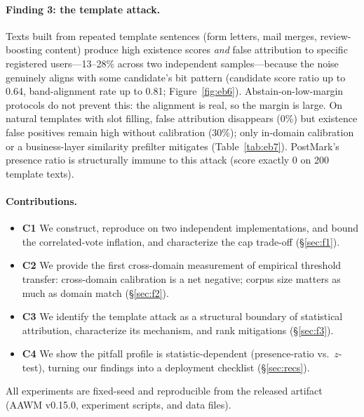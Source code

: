\paragraph{Finding 3: the template attack.}
Texts built from repeated template sentences (form letters, mail merges,
review-boosting content) produce high existence scores \emph{and} false
attribution to specific registered users---13--28\% across two independent
samples---because the noise genuinely aligns with some candidate's bit
pattern (candidate score ratio up to 0.64, band-alignment rate up to 0.81;
Figure~\ref{fig:eb6}). Abstain-on-low-margin protocols do not prevent this:
the alignment is real, so the margin is large. On natural templates with
slot filling, false attribution disappears (0\%) but existence false
positives remain high without calibration (30\%); only in-domain calibration
or a business-layer similarity prefilter mitigates (Table~\ref{tab:eb7}).
PostMark's presence ratio is structurally immune to this attack (score
exactly 0 on 200 template texts).

\paragraph{Contributions.}
\begin{itemize}
\item \textbf{C1} We construct, reproduce on two independent implementations,
and bound the correlated-vote inflation, and characterize the cap trade-off
(\S\ref{sec:f1}).
\item \textbf{C2} We provide the first cross-domain measurement of empirical
threshold transfer: cross-domain calibration is a net negative; corpus size
matters as much as domain match (\S\ref{sec:f2}).
\item \textbf{C3} We identify the template attack as a structural boundary
of statistical attribution, characterize its mechanism, and rank mitigations
(\S\ref{sec:f3}).
\item \textbf{C4} We show the pitfall profile is statistic-dependent
(presence-ratio vs.\ $z$-test), turning our findings into a deployment
checklist (\S\ref{sec:recs}).
\end{itemize}

All experiments are fixed-seed and reproducible from the released artifact
(AAWM v0.15.0, experiment scripts, and data files).
